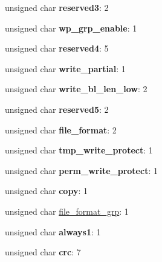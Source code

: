 \begin{DoxyCompactItemize}
\item 
unsigned char {\bfseries reserved3}\+: 2\hypertarget{struct_c_s_d_v1_a7c268265a7aa5ccd5e0f21fdca7996de}{}\label{struct_c_s_d_v1_a7c268265a7aa5ccd5e0f21fdca7996de}

\item 
unsigned char {\bfseries wp\+\_\+grp\+\_\+enable}\+: 1\hypertarget{struct_c_s_d_v1_abb28c4b98ba996aded6abfc6e8cf9b71}{}\label{struct_c_s_d_v1_abb28c4b98ba996aded6abfc6e8cf9b71}

\item 
unsigned char {\bfseries reserved4}\+: 5\hypertarget{struct_c_s_d_v1_abeea43791dfb36f60abae034e1fcd378}{}\label{struct_c_s_d_v1_abeea43791dfb36f60abae034e1fcd378}

\item 
unsigned char {\bfseries write\+\_\+partial}\+: 1\hypertarget{struct_c_s_d_v1_a58f083b73ebb46c4821163f316802c2c}{}\label{struct_c_s_d_v1_a58f083b73ebb46c4821163f316802c2c}

\item 
unsigned char {\bfseries write\+\_\+bl\+\_\+len\+\_\+low}\+: 2\hypertarget{struct_c_s_d_v1_ab23d5880dee5cbd3e060d36c516f9c89}{}\label{struct_c_s_d_v1_ab23d5880dee5cbd3e060d36c516f9c89}

\item 
unsigned char {\bfseries reserved5}\+: 2\hypertarget{struct_c_s_d_v1_ab46f13b11b6bbe418cab8026d333e32f}{}\label{struct_c_s_d_v1_ab46f13b11b6bbe418cab8026d333e32f}

\item 
unsigned char {\bfseries file\+\_\+format}\+: 2\hypertarget{struct_c_s_d_v1_a651b65baf66fb2b0ac9a039a38588ab5}{}\label{struct_c_s_d_v1_a651b65baf66fb2b0ac9a039a38588ab5}

\item 
unsigned char {\bfseries tmp\+\_\+write\+\_\+protect}\+: 1\hypertarget{struct_c_s_d_v1_adb12ef039db8d4851a8589c859ab76e6}{}\label{struct_c_s_d_v1_adb12ef039db8d4851a8589c859ab76e6}

\item 
unsigned char {\bfseries perm\+\_\+write\+\_\+protect}\+: 1\hypertarget{struct_c_s_d_v1_aa360e0bfc2d37af090d8c9bdfc3ab58f}{}\label{struct_c_s_d_v1_aa360e0bfc2d37af090d8c9bdfc3ab58f}

\item 
unsigned char {\bfseries copy}\+: 1\hypertarget{struct_c_s_d_v1_ac46106aa865bad33b5110d6f4b7cb8d9}{}\label{struct_c_s_d_v1_ac46106aa865bad33b5110d6f4b7cb8d9}

\item 
unsigned char \hyperlink{struct_c_s_d_v1_aa104e58a9ff7e4a84f90f1015c210bec}{file\+\_\+format\+\_\+grp}\+: 1
\item 
unsigned char {\bfseries always1}\+: 1\hypertarget{struct_c_s_d_v1_a32b423aa324c26e7372063f1e3b8006b}{}\label{struct_c_s_d_v1_a32b423aa324c26e7372063f1e3b8006b}

\item 
unsigned char {\bfseries crc}\+: 7\hypertarget{struct_c_s_d_v1_a333a5752214c7481588b1c41fa332863}{}\label{struct_c_s_d_v1_a333a5752214c7481588b1c41fa332863}

\end{DoxyCompactItemize}


